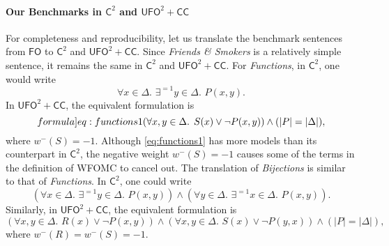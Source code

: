 \documentclass[a4paper,UKenglish,cleveref, autoref, thm-restate]{lipics-v2021}
\newcommand{\Ctwo}{$\mathsf{C}^{2}$}
\newcommand{\FO}{$\mathsf{FO}$}
\newcommand{\UFO}{$\mathsf{UFO}^{2} + \mathsf{CC}$}
\newcommand{\friends}{\emph{Friends \& Smokers}}
\newcommand{\functions}{\emph{Functions}}
\newcommand{\bijections}{\emph{Bijections}}
\begin{document}
\paragraph*{Our Benchmarks in \Ctwo{} and \UFO{}}
For completeness and reproducibility, let us translate the benchmark sentences
from \FO{} to \Ctwo{} and \UFO{}. Since \friends{} is a relatively simple
sentence, it remains the same in \Ctwo{} and \UFO{}. For \functions{}, in
\Ctwo{}, one would write
\[
  \forall x \in \Delta\text{. }\exists^{=1} y \in \Delta\text{. }P(x, y).
\]
In \UFO{}, the equivalent formulation is
\begin{equation}\label[formula]{eq:functions1}
  (\forall x, y \in \Delta\text{. }S(x) \lor \neg P(x, y)) \land (|P| = |\Delta|),
\end{equation}
where $w^{-}(S) = -1$. Although \cref{eq:functions1} has more models than its
counterpart in \Ctwo{}, the negative weight $w^{-}(S) = -1$ causes some of the
terms in the definition of WFOMC to cancel out. The translation of \bijections{}
is similar to that of \functions{}. In \Ctwo{}, one could write
\[
  (\forall x \in \Delta\text{. }\exists^{=1} y \in \Delta\text{.
  }P(x, y)) \land (\forall y \in \Delta\text{. }\exists^{=1} x \in \Delta\text{.
  }P(x, y)).
\]
Similarly, in \UFO{}, the equivalent formulation is
\[
  (\forall x, y \in \Delta\text{.
  }R(x) \lor \neg P(x, y)) \land (\forall x, y \in \Delta\text{.
  }S(x) \lor \neg P(y, x)) \land (|P| = |\Delta|),
\]
where $w^{-}(R) = w^{-}(S) = -1$.


\end{document}
